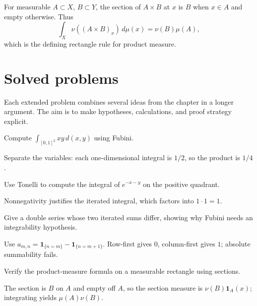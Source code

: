\begin{example}\label{ex:iii05-worked-04}
For measurable \(A\subset X\), \(B\subset Y\), the section of
\(A\times B\) at \(x\) is \(B\) when \(x\in A\) and empty otherwise. Thus
\[
\int_X \nu((A\times B)_x)\,d\mu(x)
=\nu(B)\mu(A),
\]
which is the defining rectangle rule for product measure.
\end{example}

\section{Solved problems}
Each extended problem combines several ideas from the chapter in a longer argument. The aim is to make hypotheses, calculations, and proof strategy explicit.

\begin{problem}\label{prob:iii05-problem-01}
Compute \(\int_{[0,1]^2}xy\,d(x,y)\) using Fubini.
\end{problem}
\begin{solution}
Separate the variables: each one-dimensional integral is \(1/2\), so the
product is \(1/4\).
\end{solution}

\begin{problem}\label{prob:iii05-problem-02}
Use Tonelli to compute the integral of \(e^{-x-y}\) on the positive quadrant.
\end{problem}
\begin{solution}
Nonnegativity justifies the iterated integral, which factors into
\(1\cdot1=1\).
\end{solution}

\begin{problem}\label{prob:iii05-problem-03}
Give a double series whose two iterated sums differ, showing why Fubini needs an integrability hypothesis.
\end{problem}
\begin{solution}
Use \(a_{m,n}=\mathbf1_{\{n=m\}}-\mathbf1_{\{n=m+1\}}\). Row-first gives
\(0\), column-first gives \(1\); absolute summability fails.
\end{solution}

\begin{problem}\label{prob:iii05-problem-04}
Verify the product-measure formula on a measurable rectangle using sections.
\end{problem}
\begin{solution}
The section is \(B\) on \(A\) and empty off \(A\), so the section measure is
\(\nu(B)\mathbf1_A(x)\); integrating yields \(\mu(A)\nu(B)\).
\end{solution}

